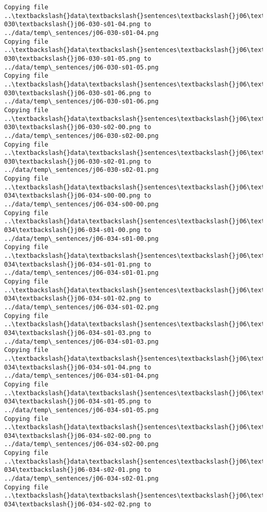 \documentclass[11pt]{article}
\begin{document}
\begin{Verbatim}[commandchars=\\\{\}]
Copying file ..\textbackslash{}data\textbackslash{}sentences\textbackslash{}j06\textbackslash{}j06-030\textbackslash{}j06-030-s01-04.png to
../data/temp\_sentences/j06-030-s01-04.png
Copying file ..\textbackslash{}data\textbackslash{}sentences\textbackslash{}j06\textbackslash{}j06-030\textbackslash{}j06-030-s01-05.png to
../data/temp\_sentences/j06-030-s01-05.png
Copying file ..\textbackslash{}data\textbackslash{}sentences\textbackslash{}j06\textbackslash{}j06-030\textbackslash{}j06-030-s01-06.png to
../data/temp\_sentences/j06-030-s01-06.png
Copying file ..\textbackslash{}data\textbackslash{}sentences\textbackslash{}j06\textbackslash{}j06-030\textbackslash{}j06-030-s02-00.png to
../data/temp\_sentences/j06-030-s02-00.png
Copying file ..\textbackslash{}data\textbackslash{}sentences\textbackslash{}j06\textbackslash{}j06-030\textbackslash{}j06-030-s02-01.png to
../data/temp\_sentences/j06-030-s02-01.png
Copying file ..\textbackslash{}data\textbackslash{}sentences\textbackslash{}j06\textbackslash{}j06-034\textbackslash{}j06-034-s00-00.png to
../data/temp\_sentences/j06-034-s00-00.png
Copying file ..\textbackslash{}data\textbackslash{}sentences\textbackslash{}j06\textbackslash{}j06-034\textbackslash{}j06-034-s01-00.png to
../data/temp\_sentences/j06-034-s01-00.png
Copying file ..\textbackslash{}data\textbackslash{}sentences\textbackslash{}j06\textbackslash{}j06-034\textbackslash{}j06-034-s01-01.png to
../data/temp\_sentences/j06-034-s01-01.png
Copying file ..\textbackslash{}data\textbackslash{}sentences\textbackslash{}j06\textbackslash{}j06-034\textbackslash{}j06-034-s01-02.png to
../data/temp\_sentences/j06-034-s01-02.png
Copying file ..\textbackslash{}data\textbackslash{}sentences\textbackslash{}j06\textbackslash{}j06-034\textbackslash{}j06-034-s01-03.png to
../data/temp\_sentences/j06-034-s01-03.png
Copying file ..\textbackslash{}data\textbackslash{}sentences\textbackslash{}j06\textbackslash{}j06-034\textbackslash{}j06-034-s01-04.png to
../data/temp\_sentences/j06-034-s01-04.png
Copying file ..\textbackslash{}data\textbackslash{}sentences\textbackslash{}j06\textbackslash{}j06-034\textbackslash{}j06-034-s01-05.png to
../data/temp\_sentences/j06-034-s01-05.png
Copying file ..\textbackslash{}data\textbackslash{}sentences\textbackslash{}j06\textbackslash{}j06-034\textbackslash{}j06-034-s02-00.png to
../data/temp\_sentences/j06-034-s02-00.png
Copying file ..\textbackslash{}data\textbackslash{}sentences\textbackslash{}j06\textbackslash{}j06-034\textbackslash{}j06-034-s02-01.png to
../data/temp\_sentences/j06-034-s02-01.png
Copying file ..\textbackslash{}data\textbackslash{}sentences\textbackslash{}j06\textbackslash{}j06-034\textbackslash{}j06-034-s02-02.png to

\end{Verbatim}
\end{document}
